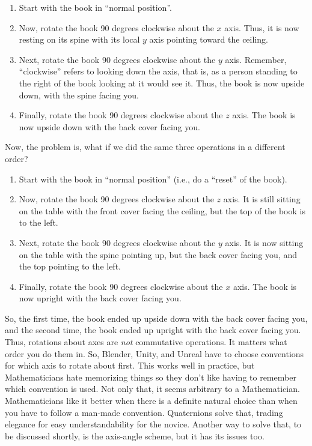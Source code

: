 \documentclass[letter,12pt]{article}
\begin{document}
\begin{enumerate}
\item Start with the book in “normal position”.
\item Now, rotate the book 90 degrees clockwise about the $x$ axis.  Thus, it is now resting on its spine with its local $y$ axis pointing toward the ceiling.
\item Next, rotate the book 90 degrees clockwise about the $y$ axis.  Remember, “clockwise” refers to looking down the axis, that is, as a person standing to the right of the book looking at it would see it.  Thus, the book is now upside down, with the spine facing you.
\item Finally, rotate the book 90 degrees clockwise about the $z$ axis.  The book is now upside down with the back cover facing you.
\end{enumerate}

Now, the problem is, what if we did the same three operations in a different order?

\begin{enumerate}
\item Start with the book in “normal position” (i.e., do a “reset” of the book).
\item Now, rotate the book 90 degrees clockwise about the $z$ axis.  It is still sitting on  the table with the front cover facing the ceiling, but the top of the book is to the left. 
\item Next, rotate the book 90 degrees clockwise about the $y$ axis.   It is now sitting on the table with the spine pointing up, but the back cover facing you, and the top pointing to the left.
\item Finally, rotate the book 90 degrees clockwise about the $x$ axis.  The book is now upright with the back cover facing you.
\end{enumerate}

So, the first time, the book ended up upside down with the back cover facing you, and the second time, the book ended up upright with the back cover facing you.  Thus, rotations about axes are \emph{not} commutative operations.  It matters what order you do them in.  So, Blender, Unity, and Unreal have to choose conventions for which axis to rotate about first. This works well in practice, but Mathematicians hate memorizing things so they don’t like having to remember which convention is used.  Not only that, it seems arbitrary to a Mathematician.  Mathematicians like it better when there is a definite natural choice than when you have to follow a man-made convention.  Quaternions solve that, trading elegance for easy understandability for the novice.  Another way to solve that, to be discussed shortly, is the axis-angle scheme, but it has its issues too.
\end{document}
